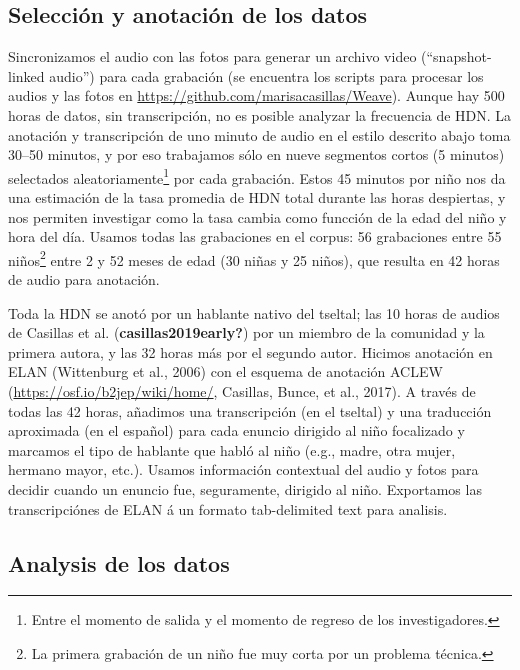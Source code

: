 \documentclass[
  english,
  ,man,floatsintext]{apa6}
\begin{document}
\hypertarget{methods-processing}{%
\subsection{Selección y anotación de los datos}\label{methods-processing}}

Sincronizamos el audio con las fotos para generar un archivo video (``snapshot-linked audio'') para cada grabación (se encuentra los scripts para procesar los audios y las fotos en \url{https://github.com/marisacasillas/Weave}). Aunque hay 500 horas de datos, sin transcripción, no es posible analyzar la frecuencia de HDN. La anotación y transcripción de uno minuto de audio en el estilo descrito abajo toma 30--50 minutos, y por eso trabajamos sólo en nueve segmentos cortos (5 minutos) selectados aleatoriamente\footnote{Entre el momento de salida y el momento de regreso de los investigadores.} por cada grabación. Estos 45 minutos por niño nos da una estimación de la tasa promedia de HDN total durante las horas despiertas, y nos permiten investigar como la tasa cambia como funcción de la edad del niño y hora del día. Usamos todas las grabaciones en el corpus: 56 grabaciones entre 55 niños\footnote{La primera grabación de un niño fue muy corta por un problema técnica.} entre 2 y 52 meses de edad (30 niñas y 25 niños), que resulta en 42 horas de audio para anotación.

Toda la HDN se anotó por un hablante nativo del tseltal; las 10 horas de audios de Casillas et al. (\textbf{casillas2019early?}) por un miembro de la comunidad y la primera autora, y las 32 horas más por el segundo autor. Hicimos anotación en ELAN (Wittenburg et al., 2006) con el esquema de anotación ACLEW (\url{https://osf.io/b2jep/wiki/home/}, Casillas, Bunce, et al., 2017). A través de todas las 42 horas, añadimos una transcripción (en el tseltal) y una traducción aproximada (en el español) para cada enuncio dirigido al niño focalizado y marcamos el tipo de hablante que habló al niño (e.g., madre, otra mujer, hermano mayor, etc.). Usamos información contextual del audio y fotos para decidir cuando un enuncio fue, seguramente, dirigido al niño. Exportamos las transcripciónes de ELAN á un formato tab-delimited text para analisis.

\hypertarget{methods-analysisinfo}{%
\subsection{Analysis de los datos}\label{methods-analysisinfo}}
\end{document}
